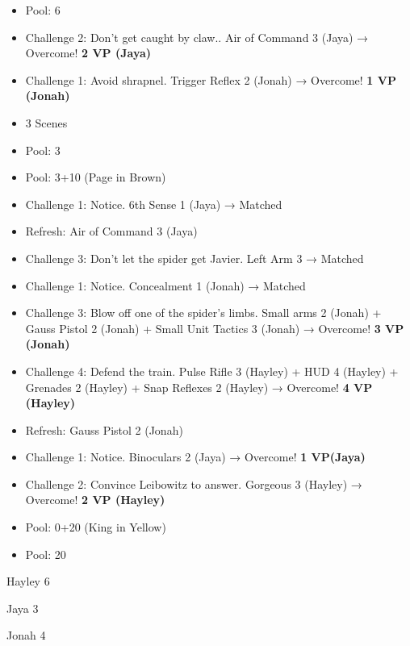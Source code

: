 \begin{itemize}
\item Pool: 6
\item Challenge 2: Don't get caught by claw.. Air of Command 3 (Jaya) → Overcome! \textbf{2 VP (Jaya)}
\item Challenge 1: Avoid shrapnel. Trigger Reflex 2 (Jonah) → Overcome! \textbf{1 VP (Jonah)}
\item 3 Scenes
\item Pool: 3
\item Pool: 3+10 (Page in Brown)
\item Challenge 1: Notice.  6th Sense 1 (Jaya) → Matched
\item Refresh: Air of Command 3 (Jaya)
\item Challenge 3: Don't let the spider get Javier.  Left Arm 3  → Matched
\item Challenge 1: Notice.  Concealment 1 (Jonah) → Matched
\item Challenge 3: Blow off one of the spider's limbs.  Small arms 2 (Jonah) + Gauss Pistol 2 (Jonah) + Small Unit Tactics 3 (Jonah) → Overcome! \textbf{3 VP (Jonah)}
\item Challenge 4: Defend the train.  Pulse Rifle 3 (Hayley) + HUD 4 (Hayley) + Grenades 2 (Hayley) + Snap Reflexes 2 (Hayley) → Overcome! \textbf{4 VP (Hayley)}
\item Refresh: Gauss Pistol 2 (Jonah)
\item Challenge 1: Notice.  Binoculars 2 (Jaya) → Overcome! \textbf{1 VP(Jaya)}
\item Challenge 2: Convince Leibowitz to answer.  Gorgeous 3 (Hayley) → Overcome! \textbf{2 VP (Hayley)}
\item Pool: 0+20 (King in Yellow)
\item Pool: 20
\end{itemize}





Hayley 6

Jaya 3

Jonah 4





